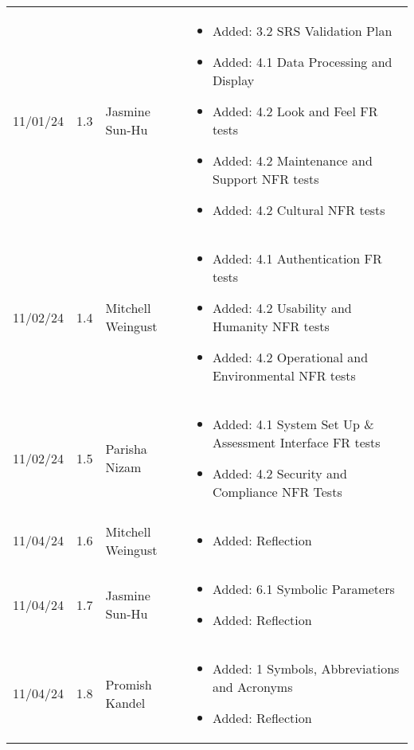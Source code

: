 \documentclass[12pt, titlepage]{article}
\begin{document}
\begin{longtable}{p{2cm}p{1cm}p{4cm}p{8cm}}
11/01/24 & 1.3 & Jasmine Sun-Hu &
\begin{itemize}[noitemsep, topsep=0pt]
  \item Added: 3.2 SRS Validation Plan
  \item Added: 4.1 Data Processing and Display
  \item Added: 4.2 Look and Feel FR tests
  \item Added: 4.2 Maintenance and Support NFR tests
  \item Added: 4.2 Cultural NFR tests
\end{itemize} \\

11/02/24 & 1.4 & Mitchell Weingust &
\begin{itemize}[noitemsep, topsep=0pt]
  \item Added: 4.1 Authentication FR tests
  \item Added: 4.2 Usability and Humanity NFR tests
  \item Added: 4.2 Operational and Environmental NFR tests
\end{itemize} \\

11/02/24 & 1.5 & Parisha Nizam &
\begin{itemize}[noitemsep, topsep=0pt]
  \item Added: 4.1 System Set Up \& Assessment Interface FR tests
  \item Added: 4.2 Security and Compliance NFR Tests
\end{itemize} \\

11/04/24 & 1.6 & Mitchell Weingust &
\begin{itemize}[noitemsep, topsep=0pt]
  \item Added: Reflection
\end{itemize} \\

11/04/24 & 1.7 & Jasmine Sun-Hu &
\begin{itemize}[noitemsep, topsep=0pt]
  \item Added: 6.1 Symbolic Parameters
  \item Added: Reflection
\end{itemize} \\

11/04/24 & 1.8 & Promish Kandel &
\begin{itemize}[noitemsep, topsep=0pt]
  \item Added: 1 Symbols, Abbreviations and Acronyms
  \item Added: Reflection
\end{itemize} \\


\end{longtable}
\end{document}
